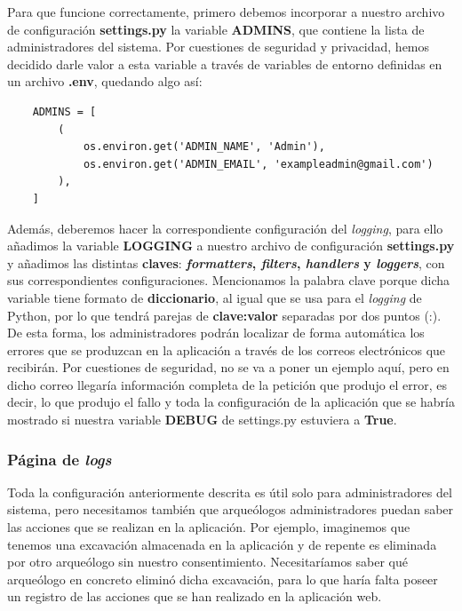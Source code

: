 Para que funcione correctamente, primero debemos incorporar a nuestro archivo de
configuración \textbf{settings.py} la variable \textbf{ADMINS}, que contiene la lista de
administradores del sistema. Por cuestiones de seguridad y privacidad, hemos decidido
darle valor a esta variable a través de variables de entorno definidas en un archivo
\textbf{.env}, quedando algo así:

    
    \begin{verbatim}
    ADMINS = [
        (
            os.environ.get('ADMIN_NAME', 'Admin'),
            os.environ.get('ADMIN_EMAIL', 'exampleadmin@gmail.com')
        ),
    ]
    \end{verbatim}

Además, deberemos hacer la correspondiente configuración del \textit{logging}, para ello
añadimos la variable \textbf{LOGGING} a nuestro archivo de configuración \textbf{settings.py}
y añadimos las distintas \textbf{claves}: \textbf{\textit{formatters}, \textit{filters},
\textit{handlers} y \textit{loggers}}, con sus correspondientes configuraciones. Mencionamos
la palabra clave porque dicha variable tiene formato de \textbf{diccionario}, al igual que
se usa para el \textit{logging} de Python, por lo que tendrá parejas de \textbf{clave:valor}
separadas por dos puntos (:). \\

De esta forma, los administradores podrán localizar de forma automática los errores
que se produzcan en la aplicación a través de los correos electrónicos que recibirán. Por
cuestiones de seguridad, no se va a poner un ejemplo aquí, pero en dicho correo llegaría
información completa de la petición que produjo el error, es decir, lo que produjo el
fallo y toda la configuración de la aplicación que se habría mostrado si nuestra variable
\textbf{DEBUG} de settings.py estuviera a \textbf{True}.


\subsubsection{Página de \textit{logs}}
Toda la configuración anteriormente descrita es útil solo para administradores del sistema,
pero necesitamos también que arqueólogos administradores puedan saber las acciones que se
realizan en la aplicación. Por ejemplo, imaginemos que tenemos una excavación almacenada en
la aplicación y de repente es eliminada por otro arqueólogo sin nuestro consentimiento.
Necesitaríamos saber qué arqueólogo en concreto eliminó dicha excavación, para lo que haría
falta poseer un registro de las acciones que se han realizado en la aplicación web. \\

